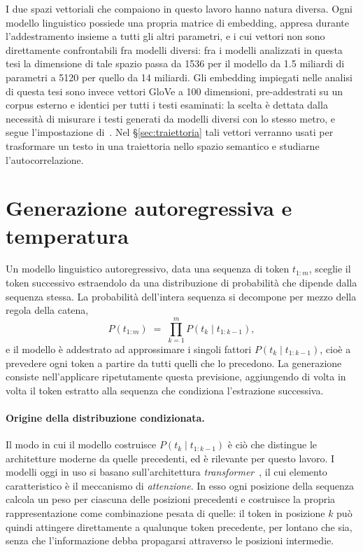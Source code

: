 I due spazi vettoriali che compaiono in questo lavoro hanno natura diversa. Ogni modello linguistico possiede una propria matrice di embedding,
appresa durante l'addestramento insieme a tutti gli altri parametri, e i cui
vettori non sono direttamente confrontabili fra modelli diversi: fra i modelli
analizzati in questa tesi la dimensione di tale spazio passa da 1536 per il
modello da 1.5 miliardi di parametri a 5120 per quello da 14 miliardi. Gli embedding impiegati nelle analisi di
questa tesi sono invece vettori GloVe a 100 dimensioni, pre-addestrati su un
corpus esterno e identici per tutti i testi esaminati: la scelta è dettata dalla
necessità di misurare i testi generati da modelli diversi con lo stesso metro, e
segue l'impostazione di~\cite{mikhaylovskiy2025states}. Nel
§\ref{sec:traiettoria} tali vettori verranno usati per trasformare un testo in
una traiettoria nello spazio semantico e studiarne l'autocorrelazione.


\section{Generazione autoregressiva e temperatura}
\label{sec:temperatura}

Un modello linguistico autoregressivo, data una sequenza di token $t_{1:m}$,
sceglie il token successivo estraendolo da una distribuzione di probabilità che
dipende dalla sequenza stessa. La probabilità dell'intera sequenza si
decompone per mezzo della regola della catena,
\begin{equation}
  P(t_{1:m}) \;=\; \prod_{k=1}^{m} P(t_k \mid t_{1:k-1}),
  \label{eq:autoregressivo}
\end{equation}
e il modello è addestrato ad approssimare i singoli fattori
$P(t_k \mid t_{1:k-1})$, cioè a prevedere ogni token a partire da tutti quelli
che lo precedono. La generazione consiste nell'applicare ripetutamente questa
previsione, aggiungendo di volta in volta il token estratto alla sequenza che
condiziona l'estrazione successiva.

\paragraph{Origine della distribuzione condizionata.}
Il modo in cui il modello costruisce $P(t_k \mid t_{1:k-1})$ è ciò che
distingue le architetture moderne da quelle precedenti, ed è rilevante per
questo lavoro. I modelli oggi in uso si basano sull'architettura
\emph{transformer}~\cite{vaswani2017}, il cui elemento caratteristico è il
meccanismo di \emph{attenzione}. In esso ogni posizione della sequenza calcola
un peso per ciascuna delle posizioni precedenti e costruisce la propria
rappresentazione come combinazione pesata di quelle: il token in posizione $k$
può quindi attingere direttamente a qualunque token precedente, per lontano che
sia, senza che l'informazione debba propagarsi attraverso le posizioni
intermedie.

